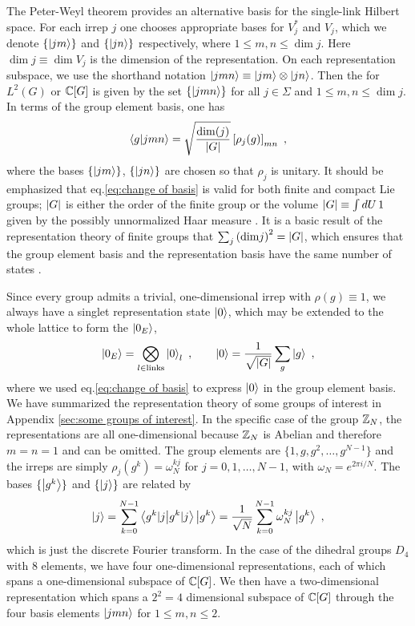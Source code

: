 The Peter-Weyl theorem provides an alternative basis for the single-link Hilbert space.
For each irrep $j$ one chooses appropriate bases for $V_j^*$ and $V_j$, which we denote $\{\ket{jm}\}$ and $\{\ket{jn}\}$ respectively, where $1 \leq m,n \leq \dim{j}$.
Here $\dim{j} \equiv \dim{V_j}$ is the dimension of the representation.
On each representation subspace, we use the shorthand notation $\ket{jmn} \equiv \ket{jm} \otimes \ket{jn}$.
Then the  for $L^2(G)$ or $\mathbb{C}[G]$ is given by the set $\{\ket{jmn}\}$ for all $j \in \Sigma$ and $1 \leq m,n \leq \dim{j}$.
In terms of the group element basis, one has \cite{ZoharBurrello}
\begin{equation}
    \label{eq:change of basis}
    \expval{g|jmn}= \sqrt{\frac{\mathrm{dim}(j)}{\abs{G}}} \left[\rho_j(g)\right]_{mn} \ ,
\end{equation}
where the bases $\{\ket{jm}\}$, $\{\ket{jn}\}$ are chosen so that $\rho_j$ is unitary.
It should be emphasized that eq.\eqref{eq:change of basis} is valid for both finite and compact Lie groups; $\abs{G}$ is either the order of the finite group or the volume $\abs{G}\equiv\int dU\, 1$ given by the possibly unnormalized Haar measure \cite{Osborne, marianithesis}.
It is a basic result of the representation theory of finite groups that $\sum_j \pqty{\dim{j}}^2 = \abs{G}$, which ensures that the group element basis and the representation basis have the same number of states \cite{Serre}.

Since every group admits a trivial, one-dimensional irrep with $\rho(g)\equiv 1$, we always have a singlet representation state $\ket{0}$, which may be extended to the whole lattice to form the  $\ket{0_E}$,
\begin{equation}
    \label{eq:electric ground state}
    \ket{0_E} = \bigotimes_{l \in \mathrm{links}} \ket{0}_l \ , \quad \quad \ket{0}=\frac{1}{\sqrt{\abs{G}}} \sum_g \ket{g} \ ,
\end{equation}
where we used eq.\eqref{eq:change of basis} to express $\ket{0}$ in the group element basis.
We have summarized the representation theory of some groups of interest in Appendix \ref{sec:some groups of interest}.
In the specific case of the group $\mathbb{Z}_N$, the representations are all one-dimensional because $\mathbb{Z}_N$ is Abelian and therefore $m=n=1$ and can be omitted.
The group elements are $\{1, g, g^2, \ldots, g^{N-1}\}$ and the irreps are simply $\rho_j (g^k) = \omega_N^{kj}$ for $j = 0,1,\ldots, N-1$, with $\omega_N= e^{2\pi i /N}$.
The bases $\{\ket{g^k}\}$ and $\{\ket{j}\}$ are related by
\begin{equation}
    \ket{j} = \sum_{k=0}^{N-1} \braket{g^k|j} \ket{g^k} = \frac{1}{\sqrt{N}}\sum_{k=0}^{N-1} \omega_N^{kj} \ket{g^k} \ ,
\end{equation}
which is just the discrete Fourier transform.
In the case of the dihedral groups $D_4$ with $8$ elements, we have four one-dimensional representations, each of which spans a one-dimensional subspace of $\mathbb{C}[G]$.
We then have a two-dimensional representation which spans a $2^2=4$ dimensional subspace of $\mathbb{C}[G]$ through the four basis elements $\ket{jmn}$ for $1 \leq m, n \leq 2$.

